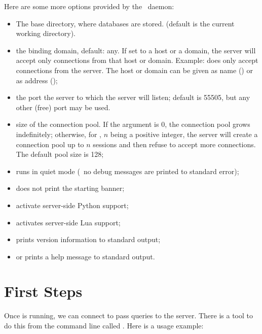 \begin{minipage}{\textwidth}
Here are some more options provided by
the \nowdb\ daemon:

\begin{itemize}
\item {} The base directory,
where databases are stored.
(default is the current working directory).

\item {} the binding domain, default:
any. If set to a host or a domain, the server
will accept only connections from that host
or domain. Example:  does
only accept connections from the server.
The host or domain can be given as name ()
or as  address ();

\item {} the port the server to which
the server will listen; default is 55505,
but any other (free) port may be used.
 
\item {} size of the connection pool.
If the argument is 0, the connection pool grows
indefinitely; otherwise, for ,
$n$ being a positive integer,
the server will create a connection pool
up to $n$ sessions and then refuse to accept
more connections. The default pool size is 128;

\item {} runs in quiet mode
(\ie\ no debug messages are printed to standard error);
\item {} does not print the starting banner;
\item {} activate server-side Python support;
\item {} activates server-side Lua support;
\item {} prints version information to standard output;
\item {} or  prints a help message to standard output.
\end{itemize}
\end{minipage}

\section{First Steps}
Once  is running, we can connect to pass
queries to the server. There is a tool to do this from the command line
called . Here is a usage example:

